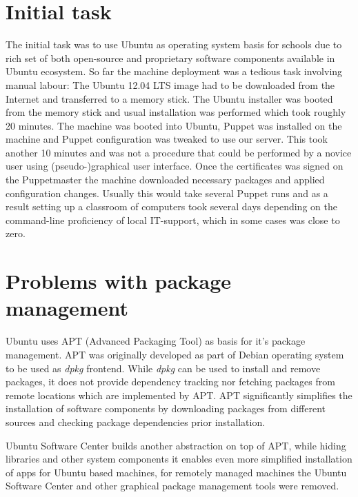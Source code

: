 \documentclass[a4paper,11pt]{kth-mag}
\begin{document}
\section{Initial task}

The initial task was to use Ubuntu as operating system basis
for schools due to rich set of both open-source and
proprietary software components available in Ubuntu ecosystem.
So far the machine deployment was a tedious task involving
manual labour:
The Ubuntu 12.04 LTS image had to be downloaded from the Internet
and transferred to a memory stick.
The Ubuntu installer was booted from the memory stick
and usual installation was performed which took roughly 20 minutes.
The machine was booted into Ubuntu,
Puppet was installed on the machine and Puppet configuration
was tweaked to use our server.
This took another 10 minutes and was not a procedure that could
be performed by a novice user using (pseudo-)graphical user interface.
Once the certificates was signed on the Puppetmaster the
machine downloaded necessary packages and applied configuration
changes.
Usually this would take several Puppet runs and as a result
setting up a classroom of computers took several days
depending on the command-line proficiency of local
IT-support, which in some cases was close to zero.

\section{Problems with package management}

Ubuntu uses APT (Advanced Packaging Tool) as basis for
it's package management.
APT was originally developed as part of Debian operating system
to be used as \emph{dpkg} frontend.
While \emph{dpkg} can be used to install and remove packages,
it does not provide dependency tracking nor fetching
packages from remote locations which are implemented by APT.
APT significantly simplifies the installation of software
components by downloading packages from different sources
and checking package dependencies prior installation.

Ubuntu Software Center builds another abstraction on top of APT,
while hiding libraries and other system components it enables
even more simplified installation of apps for Ubuntu based
machines, for remotely managed machines the Ubuntu Software Center
and other graphical package management tools were removed.
\end{document}
